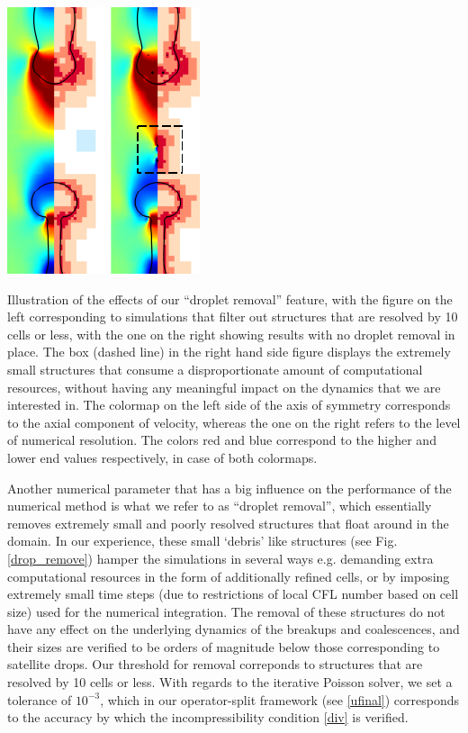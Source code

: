 \begin{marginfigure}[-6cm]
\centering
\includegraphics{plots/ligament_breakup/drop_removal.pdf}
	\caption{Illustration of the effects of our ``droplet removal'' feature, 
	with the figure on the left corresponding to simulations that filter out
	structures that are resolved by 10 cells or less, with the one on the right
	showing results with no droplet removal in place. The box (dashed line) in the 
	right hand side figure displays the extremely small structures that consume 
	a disproportionate amount of computational resources, without having any meaningful
	impact on the dynamics that we are interested in. 
	The colormap on the left side of the axis of 
	symmetry corresponds to the axial component of velocity, whereas the one on the right refers
	to the level of numerical resolution. The colors red and blue correspond to the higher 
	and lower end values respectively, in case of both colormaps. 
	}
\label{drop_remove}
\end{marginfigure}

Another numerical parameter that has a big influence on the performance of 
the numerical method is what we refer to as ``droplet removal'', 
which essentially removes extremely small and poorly 
resolved structures that float around in the domain. 
In our experience, these small `debris' like structures (see Fig. \ref{drop_remove})
hamper the simulations in several ways e.g. demanding extra computational 
resources in the form of additionally refined cells, 
or by imposing extremely small time steps (due to restrictions of 
local CFL number based on cell size) used for the numerical integration. 
The removal of these structures do not have any effect on the 
underlying dynamics of the breakups and coalescences, and their sizes 
are verified to be orders of magnitude below those corresponding to satellite drops. 
Our threshold for removal correponds to structures that are resolved by 10 cells or less. 
With regards to the iterative Poisson solver, we set a tolerance of $10^{-3}$, which in our
operator-split framework (see \eqref{ufinal}) corresponds to the 
accuracy by which the incompressibility condition \eqref{div} is verified. 

